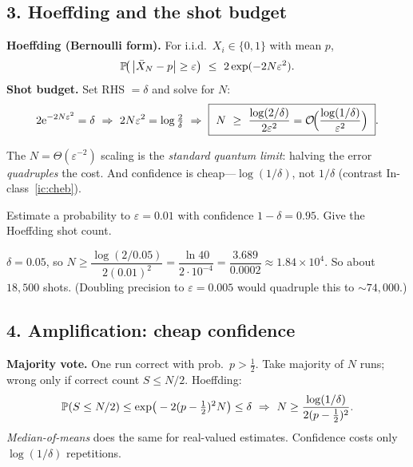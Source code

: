 \documentclass[11pt]{article}
\begin{document}
\subsection*{3. Hoeffding and the shot budget }
\begin{board}
\textbf{Hoeffding (Bernoulli form).} For i.i.d.\ $X_i\in\{0,1\}$ with mean $p$,
\[
  \mathbb{P}\!\big(\left\lvert \bar X_N-p \right\rvert\ge\varepsilon\big)\ \le\ 2\exp(-2N\varepsilon^2).
\]
\textbf{Shot budget.} Set RHS $=\delta$ and solve for $N$:
\[
  2\ee^{-2N\varepsilon^2}=\delta
  \ \Rightarrow\ 2N\varepsilon^2=\log\tfrac2\delta
  \ \Rightarrow\ \boxed{\ N\ \ge\ \dfrac{\log(2/\delta)}{2\varepsilon^2}
  =\bigo\!\Big(\dfrac{\log(1/\delta)}{\varepsilon^2}\Big)\ }.
\]
\end{board}
The $N=\Theta(\varepsilon^{-2})$ scaling is the \emph{standard quantum limit}: halving
the error \emph{quadruples} the cost. And confidence is cheap---$\log(1/\delta)$, not
$1/\delta$ (contrast In-class~\ref{ic:cheb}).


\begin{inclass}\label{ic:shots}
Estimate a probability to $\varepsilon=0.01$ with confidence $1-\delta=0.95$. Give the
Hoeffding shot count.
\end{inclass}
\begin{answer}
$\delta=0.05$, so $N\ge\dfrac{\log(2/0.05)}{2(0.01)^2}=\dfrac{\ln 40}{2\cdot10^{-4}}
=\dfrac{3.689}{0.0002}\approx1.84\times10^4$. So about $18{,}500$ shots. (Doubling
precision to $\varepsilon=0.005$ would quadruple this to $\sim74{,}000$.)
\end{answer}

\subsection*{4. Amplification: cheap confidence }
\begin{board}
\textbf{Majority vote.} One run correct with prob.\ $p>\tfrac12$. Take majority of $N$
runs; wrong only if correct count $S\le N/2$. Hoeffding:
\[
  \mathbb{P}(S\le N/2)\le\exp\!\big(-2(p-\tfrac12)^2N\big)\le\delta
  \ \Rightarrow\ N\ge\frac{\log(1/\delta)}{2(p-\tfrac12)^2}.
\]
\emph{Median-of-means} does the same for real-valued estimates. Confidence costs only
$\log(1/\delta)$ repetitions.
\end{board}
\end{document}
